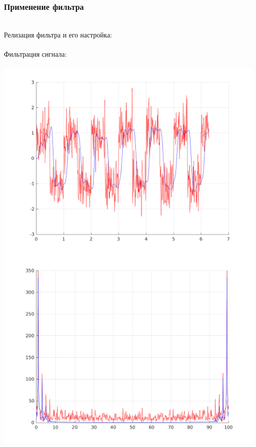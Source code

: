 \documentclass[a4paper]{article}
\begin{document}
\subsubsection{Применение фильтра}\\
Релизация фильтра и его настройка:\\
\\
Фильтрация сигнала:\\
\\
\includegraphics[scale=0.7]{lab3/figures/figure_10.png}\\
\includegraphics[scale=0.7]{lab3/figures/figure_11.png}\\
\end{document}
